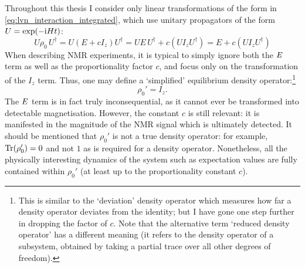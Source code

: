 Throughout this thesis I consider only linear transformations of the form in \cref{eq:lvn_interaction_integrated}, which use unitary propagators of the form $U = \exp(-\mathrm{i} Ht)$:
\begin{equation}
    \label{eq:unitary_rho0}
    U\rho_0\,U^\dagger = U(E + cI_z)U^\dagger = UE\,U^\dagger + c(UI_zU^\dagger) = E + c(UI_zU^\dagger)
\end{equation}
When describing NMR experiments, it is typical to simply ignore both the $E\/$ term as well as the proportionality factor $c$, and focus only on the transformation of the $I_z$ term.
Thus, one may define a `simplified' equilibrium density operator:\footnote{This is similar to the `deviation' density operator\autocite{Chuang1998PRSLA,Jones2011PNMRS} which measures how far a density operator deviates from the identity; but I have gone one step further in dropping the factor of $c$. Note that the alternative term `reduced density operator' has a different meaning (it refers to the density operator of a subsystem, obtained by taking a partial trace over all other degrees of freedom).}
\begin{equation}
    \label{eq:rho0_simplified}
    \rho_0' = I_z.
\end{equation}
The $E\/$ term is in fact truly inconsequential, as it cannot ever be transformed into detectable magnetisation.
However, the constant $c$ is still relevant: it is manifested in the magnitude of the NMR signal which is ultimately detected.
It should be mentioned that $\rho_0'$ is not a true density operator: for example, $\operatorname{Tr}(\rho_0') = 0$ and not $1$ as is required for a density operator.
Nonetheless, all the physically interesting dynamics of the system such as expectation values are fully contained within $\rho_0'$ (at least up to the proportionality constant $c$).
